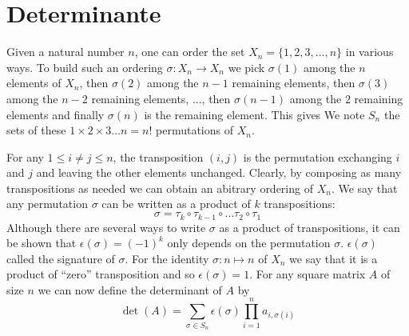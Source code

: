 \section{Determinante}

Given a natural number $n$, one can order the set $X_n = \{ 1, 2, 3, ..., n \}$
in various ways. To build such an ordering $\sigma: X_n \rightarrow X_n$ we
pick $\sigma(1)$ among the $n$ elements of $X_n$, then $\sigma(2)$ among the
$n-1$ remaining elements, then $\sigma(3)$ among the $n-2$ remaining elements,
..., then $\sigma(n-1)$ among the $2$ remaining elements and finally
$\sigma(n)$ is the remaining element. This gives
We note $S_n$ the sets of these $1 \times 2 \times 3 \dots n = n!$ permutations
of $X_n$.

For any $1\leq i \neq j \leq n$, the transposition $(i,j)$ is the
permutation exchanging $i$ and $j$ and leaving the other elements unchanged.
Clearly, by composing as many transpositions as needed we can obtain an
abitrary ordering of $X_n$. We say that any permutation $\sigma$ can be written
as a product of $k$ transpositions:
$$\sigma = \tau_k \circ \tau_{k-1} \circ \dots \tau_2 \circ \tau_1$$
Although there are several ways to write $\sigma$ as a product of
transpositions, it can be shown that $\epsilon(\sigma) = {(-1)}^k$ only depends
on the permutation $\sigma$. $\epsilon(\sigma)$ called the signature of
$\sigma$. For the identity
$\sigma: n \mapsto n$ of $X_n$ we say that it is a product of ``zero''
transposition and so $\epsilon(\sigma) = 1$.
For any square matrix $A$ of size $n$ we can now define the determinant of $A$
by
$$\det(A) = \sum_{\sigma \in S_n} \epsilon(\sigma) \prod_{i=1}^n a_{i,\sigma(i)}$$

